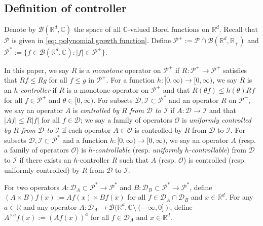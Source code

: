 \documentclass[12pt,a4paper]{amsart}
\theoremstyle{plain}
\theoremstyle{definition}
\numberwithin{equation}{section}
\begin{document}
\subsection{Definition of controller}
\label{sec: controller}
Denote by $\mathcal B(\mathbb R^d, \mathbb C)$ the space of all $\mathbb C$-valued Borel functions on $\mathbb R^d$.
Recall that $\mathcal P$ is given in \eqref{eq: polynomial growth function}.
Define $\mathcal P^+:= \mathcal P \cap \mathcal B(\mathbb R^d, \mathbb R_+)$ and $\mathcal P^*:= \{f\in \mathcal B(\mathbb R^d, \mathbb C): |f|\in \mathcal P^+\}$.

In this paper, we say $R$ is a \emph{monotone} operator on $\mathcal P^+$ if $R:\mathcal P^+ \to \mathcal P^+$ satisfies that $Rf\leq Rg$ for all $f\leq g$ in $\mathcal P^+$.
For a function $h: [0,\infty) \to [0,\infty)$, we say $R$ is an \emph{$h$-controller} if $R$ is a monotone operator on $\mathcal P^+$ and that $R(\theta f)\leq h(\theta) Rf$ for all $f\in \mathcal P^+$ and $\theta \in [0,\infty)$.
For subsets $\mathcal D, \mathcal I\subset \mathcal P^*$ and an operator $R$ on $\mathcal P^+$, we say an operator $A$ is \emph{controlled by $R$ from $\mathcal D$ to $\mathcal I$} if $A:\mathcal D \to \mathcal I$ and that $|Af| \leq R|f|$ for all $f\in \mathcal D$;
we say a family of operators $\mathscr O$ is \emph{uniformly controlled by $R$ from $\mathcal D$ to $\mathcal I$} if
each operator $A\in \mathscr O$  is controlled by $R$ from $\mathcal D$ to $\mathcal I$.
For subsets $\mathcal D, \mathcal I\subset \mathcal P^*$ and a function $h:[0,\infty) \to [0,\infty)$, we say an operator $A$ (resp. a family of operators $\mathscr O$) is \emph{$h$-controllable} (resp. \emph{uniformly $h$-controllable}) from $\mathcal D$ to $\mathcal I$ if there exists an $h$-controller $R$ such that $A$ (resp. $\mathscr O$) is controlled (resp. uniformly controlled) by $R$ from $\mathcal D$ to $\mathcal I$.

For two operators $A: \mathcal D_A \subset \mathcal P^*\to \mathcal P^*$ and $B: \mathcal D_B \subset \mathcal P^*\to \mathcal P^*$, define $(A \times B)f (x):= Af(x) \times Bf(x)$ for all $f\in \mathcal D_A \cap \mathcal D_B$ and $x\in \mathbb{R}^d$.
For any $a \in \mathbb R$ and any operator $A :\mathcal D_A \to \mathcal B(\mathbb R^d, \mathbb C\setminus (-\infty, 0])$, define $A^{\times a}f(x):= (Af(x))^a$ for all $f\in \mathcal D_A$ and $x\in \mathbb R^d$.
\end{document}
